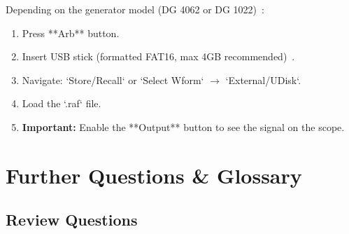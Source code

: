 \documentclass[a4paper,12pt]{article}
\begin{document}
Depending on the generator model (DG 4062 or DG 1022)~\cite{ref211,ref224}:

\begin{enumerate}

    \item Press **Arb** button.

    \item Insert USB stick (formatted FAT16, max 4GB recommended)~\cite{ref186}.

    \item Navigate: `Store/Recall` or `Select Wform` $\rightarrow$ `External/UDisk`.

    \item Load the `.raf` file.

    \item \textbf{Important:} Enable the **Output** button to see the signal on the scope.

\end{enumerate}



\newpage



\section{Further Questions \& Glossary}



\subsection{Review Questions}
\end{document}
